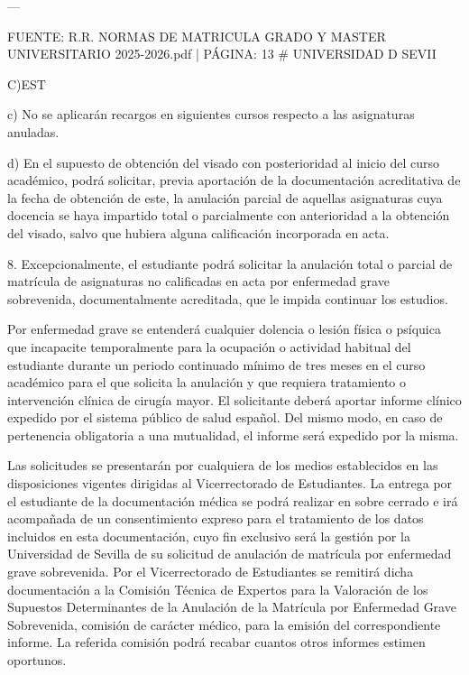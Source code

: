 \documentclass{article}
\begin{document}
\begin{itemize}
\begin{itemize}
\begin{scriptsize}
                  ---

                  FUENTE: R.R. NORMAS DE MATRICULA GRADO Y MASTER UNIVERSITARIO 2025-2026.pdf | PÁGINA: 13
                  \# UNIVERSIDAD D SEVII

                  C)EST

                  c) No se aplicarán recargos en siguientes cursos respecto a las asignaturas anuladas.

                  d) En el supuesto de obtención del visado con posterioridad al inicio del curso académico, podrá solicitar, previa aportación de la documentación acreditativa de la fecha de obtención de este, la anulación parcial de aquellas asignaturas cuya docencia se haya impartido total o parcialmente con anterioridad a la obtención del visado, salvo que hubiera alguna calificación incorporada en acta.

                  8. Excepcionalmente, el estudiante podrá solicitar la anulación total o parcial de matrícula de asignaturas no calificadas en acta por enfermedad grave sobrevenida, documentalmente acreditada, que le impida continuar los estudios.

                  Por enfermedad grave se entenderá cualquier dolencia o lesión física o psíquica que incapacite temporalmente para la ocupación o actividad habitual del estudiante durante un periodo continuado mínimo de tres meses en el curso académico para el que solicita la anulación y que requiera tratamiento o intervención clínica de cirugía mayor. El solicitante deberá aportar informe clínico expedido por el sistema público de salud español. Del mismo modo, en caso de pertenencia obligatoria a una mutualidad, el informe será expedido por la misma.

                  Las solicitudes se presentarán por cualquiera de los medios establecidos en las disposiciones vigentes dirigidas al Vicerrectorado de Estudiantes. La entrega por el estudiante de la documentación médica se podrá realizar en sobre cerrado e irá acompañada de un consentimiento expreso para el tratamiento de los datos incluidos en esta documentación, cuyo fin exclusivo será la gestión por la Universidad de Sevilla de su solicitud de anulación de matrícula por enfermedad grave sobrevenida. Por el Vicerrectorado de Estudiantes se remitirá dicha documentación a la Comisión Técnica de Expertos para la Valoración de los Supuestos Determinantes de la Anulación de la Matrícula por Enfermedad Grave Sobrevenida, comisión de carácter médico, para la emisión del correspondiente informe. La referida comisión podrá recabar cuantos otros informes estimen oportunos.


\end{scriptsize}
\end{itemize}
\end{itemize}
\end{document}
